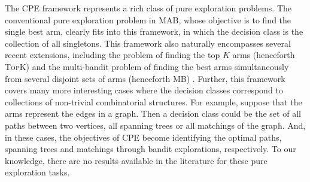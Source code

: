 \documentclass{article}
\newcommand{\Problem}{{CPE}\xspace}
\newcommand{\MultiIdent}{\textsc{TopK}\xspace}
\newcommand{\MultiBandit}{\textsc{MB}\xspace}
\begin{document}
The \Problem framework represents a rich class of pure exploration problems.
The conventional pure exploration problem in MAB, whose objective is to find the single best arm, clearly fits into this framework, in which the decision class is the collection of all singletons. 
This framework also naturally encompasses several recent extensions, including the problem of finding the top $K$ arms (henceforth \MultiIdent) \citep{kalyanakrishnan2010efficient,kalyanakrishnan2012pac,bubeck2013multiple,kaufmann2013information,zhou2014optimal} and the
multi-bandit problem of finding the best arms simultaneously from several disjoint sets of arms (henceforth \MultiBandit) \citep{NIPS2011_4478,bubeck2013multiple}.
Further, this framework  covers many more interesting cases where the decision classes correspond to collections of non-trivial combinatorial structures.
For example, suppose that the arms represent the edges in a graph.
Then a decision class could be the set of all paths between two vertices, all spanning trees or all matchings of the graph. 
And, in these cases, the objectives of \Problem become identifying the optimal paths, spanning trees and matchings through bandit explorations, respectively.
To our knowledge, there are no results available in the literature for these  pure exploration tasks.

\end{document}
